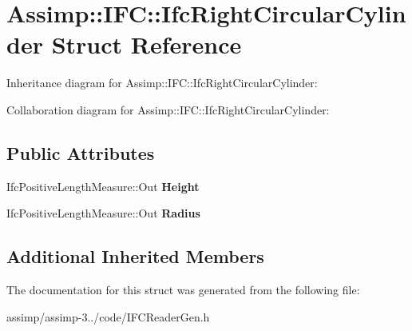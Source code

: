 \hypertarget{struct_assimp_1_1_i_f_c_1_1_ifc_right_circular_cylinder}{\section{Assimp\+:\+:I\+F\+C\+:\+:Ifc\+Right\+Circular\+Cylinder Struct Reference}
\label{struct_assimp_1_1_i_f_c_1_1_ifc_right_circular_cylinder}
}


Inheritance diagram for Assimp\+:\+:I\+F\+C\+:\+:Ifc\+Right\+Circular\+Cylinder\+:


Collaboration diagram for Assimp\+:\+:I\+F\+C\+:\+:Ifc\+Right\+Circular\+Cylinder\+:
\subsection*{Public Attributes}
\begin{DoxyCompactItemize}
\item 
\hypertarget{struct_assimp_1_1_i_f_c_1_1_ifc_right_circular_cylinder_ad66d26b12d17b8e9b3f776031f260ce3}{Ifc\+Positive\+Length\+Measure\+::\+Out {\bfseries Height}}\label{struct_assimp_1_1_i_f_c_1_1_ifc_right_circular_cylinder_ad66d26b12d17b8e9b3f776031f260ce3}

\item 
\hypertarget{struct_assimp_1_1_i_f_c_1_1_ifc_right_circular_cylinder_a03eacb580654573827a190f73f301fb8}{Ifc\+Positive\+Length\+Measure\+::\+Out {\bfseries Radius}}\label{struct_assimp_1_1_i_f_c_1_1_ifc_right_circular_cylinder_a03eacb580654573827a190f73f301fb8}

\end{DoxyCompactItemize}
\subsection*{Additional Inherited Members}


The documentation for this struct was generated from the following file\+:\begin{DoxyCompactItemize}
\item 
assimp/assimp-\/3../code/I\+F\+C\+Reader\+Gen.\+h\end{DoxyCompactItemize}

